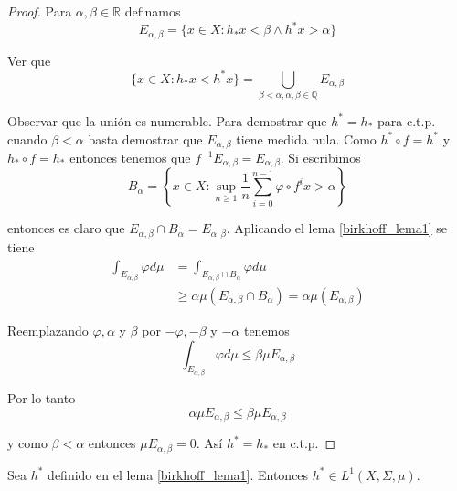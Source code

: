 \begin{proof}	
	Para $\alpha,\beta \in \mathbb{R}$ definamos
	\begin{equation}
		E_{\alpha,\beta} = \{ x \in X: h_* x < \beta \wedge h^* x > \alpha \}
	\end{equation}
	
	Ver que
	\begin{equation}
		\{x \in X: h_* x < h^* x\} = \bigcup_{\beta < \alpha, \alpha,\beta \in \mathbb{Q}} E_{\alpha,\beta}
	\end{equation}
	
	Observar que la unión es numerable. Para demostrar que $h^* = h_*$ para c.t.p. cuando $\beta < \alpha$ basta demostrar que $E_{\alpha,\beta}$ tiene medida nula. Como $h^* \circ f = h^*$ y $h_* \circ f = h_*$ entonces tenemos que $f^{-1}E_{\alpha,\beta} = E_{\alpha,\beta}$. Si escribimos 
	\begin{equation}
		B_{\alpha} = \left\{ x \in X: \sup_{n \geq 1} \frac{1}{n} \sum_{i=0}^{n-1} \varphi \circ f^i x > \alpha \right\}
	\end{equation}
	
	entonces es claro que $E_{\alpha,\beta} \cap B_{\alpha} = E_{\alpha,\beta}$. Aplicando el lema \ref{birkhoff_lema1} se tiene
	\begin{align}
		\int_{E_{\alpha,\beta}} \varphi d\mu &= \int_{E_{\alpha,\beta} \cap B_{\alpha}} \varphi d\mu\\
		&\geq \alpha \mu(E_{\alpha,\beta} \cap B_{\alpha}) = \alpha \mu(E_{\alpha,\beta})
	\end{align}
	
	Reemplazando $\varphi,\alpha$ y $\beta$ por $-\varphi,-\beta$ y $-\alpha$ tenemos
	\begin{equation}
		\int_{E_{\alpha,\beta}} \varphi d\mu \leq \beta \mu E_{\alpha,\beta}
	\end{equation}
	
	Por lo tanto
	\begin{equation}
		\alpha \mu E_{\alpha,\beta} \leq \beta \mu E_{\alpha,\beta}
	\end{equation}
	
	y como $\beta < \alpha$ entonces $\mu E_{\alpha,\beta} = 0$. Así $h^*=h_*$ en c.t.p.
\end{proof}

\begin{lema}\label{birkhoff_lema2}
	Sea $h^*$  definido en el lema \ref{birkhoff_lema1}. Entonces $h^* \in L^1(X,\Sigma,\mu)$.
\end{lema}

